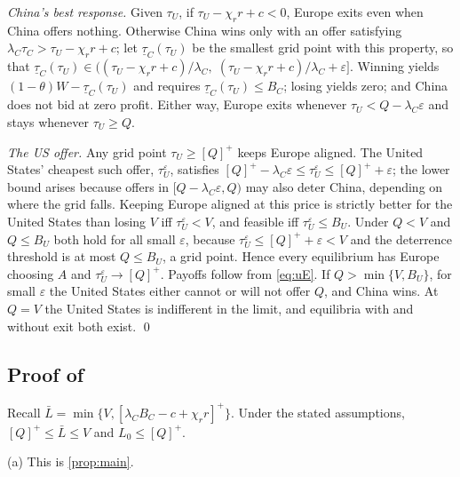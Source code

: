 \emph{China's best response.} Given $\tau_U$, if $\tau_U - \chi_r r + c < 0$, Europe exits even when China offers nothing. Otherwise China wins only with an offer satisfying $\lambda_C \tau_C > \tau_U - \chi_r r + c$; let $\underline\tau_C(\tau_U)$ be the smallest grid point with this property, so that $\underline\tau_C(\tau_U) \in \big((\tau_U - \chi_r r + c)/\lambda_C,\; (\tau_U - \chi_r r + c)/\lambda_C + \varepsilon\big]$. Winning yields $(1-\theta)W - \underline\tau_C(\tau_U)$ and requires $\underline\tau_C(\tau_U)\leq B_C$; losing yields zero; and China does not bid at zero profit. Either way, Europe exits whenever $\tau_U < Q - \lambda_C\varepsilon$ and stays whenever $\tau_U \geq Q$.

\emph{The US offer.} Any grid point $\tau_U \geq [Q]^+$ keeps Europe aligned. The United States' cheapest such offer, $\tau_U^\varepsilon$, satisfies $[Q]^+ - \lambda_C \varepsilon \leq \tau_U^\varepsilon \leq [Q]^+ + \varepsilon$; the lower bound arises because offers in $[Q - \lambda_C\varepsilon, Q)$ may also deter China, depending on where the grid falls. Keeping Europe aligned at this price is strictly better for the United States than losing $V$ iff $\tau_U^\varepsilon < V$, and feasible iff $\tau_U^\varepsilon \leq B_U$. Under $Q<V$ and $Q \leq B_U$ both hold for all small $\varepsilon$, because $\tau_U^\varepsilon \leq [Q]^+ + \varepsilon < V$ and the deterrence threshold is at most $Q \leq B_U$, a grid point. Hence every equilibrium has Europe choosing $A$ and $\tau_U^\varepsilon \to [Q]^+$. Payoffs follow from \cref{eq:uE}. If $Q > \min\{V,B_U\}$, for small $\varepsilon$ the United States either cannot or will not offer $Q$, and China wins. At $Q=V$ the United States is indifferent in the limit, and equilibria with and without exit both exist. \qed

\subsection*{Proof of }

Recall $\bar L = \min\{V, [\lambda_C B_C - c + \chi_r r]^+\}$. Under the stated assumptions, $[Q]^+ \leq \bar L \leq V$ and $L_0 \leq [Q]^+$.

(a) This is \cref{prop:main}.

